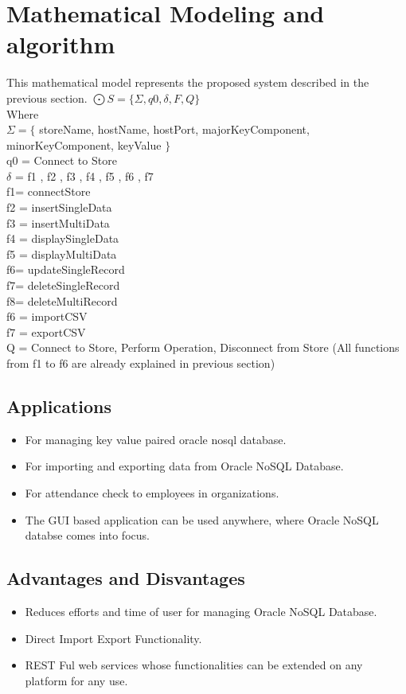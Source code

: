 \section{Mathematical Modeling and algorithm}
This mathematical model represents the proposed system described in the previous section.
$\bigodot S=\{\Sigma,q0,\delta,F,Q\} $ \\
Where \\
$\Sigma = \{ $ storeName, hostName, hostPort, majorKeyComponent, minorKeyComponent,  keyValue $\}$ \\
q0 = {Connect to Store} \\
$\delta$ = {f1 , f2 , f3 , f4 , f5 , f6 , f7} \\
f1= connectStore \\
f2 = insertSingleData \\
f3 = insertMultiData \\
f4 = displaySingleData \\
f5 = displayMultiData \\
f6= updateSingleRecord \\
f7= deleteSingleRecord \\
f8= deleteMultiRecord \\
f6 = importCSV \\
f7 = exportCSV \\
Q = {Connect to Store, Perform Operation, Disconnect from Store}
(All functions from f1 to f6 are already explained in previous section)


\subsection{Applications}
\begin{itemize}
  \item For managing key value paired oracle nosql database.
  \item For importing and exporting data from Oracle NoSQL Database.
  \item For attendance check to employees in organizations.
  \item The GUI based application can be used anywhere, where Oracle NoSQL databse comes into focus.
\end{itemize}

\subsection{Advantages and Disvantages}
\begin{itemize}
  \item Reduces efforts and time of user for managing Oracle NoSQL Database.
  \item Direct Import Export Functionality.
  \item REST Ful web services whose functionalities can be extended on any platform for any use.
\end{itemize}
